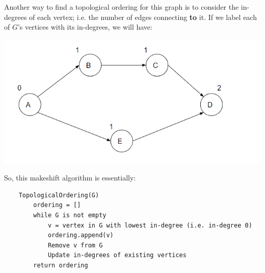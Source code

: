 \documentclass[letterpaper]{article}
\begin{document}
Another way to find a topological ordering for this graph is to consider the in-degrees of each vertex; i.e. the number of edges connecting \textbf{to} it. If we label each of $G$'s vertices with its in-degrees, we will have: 
\begin{center}
    \includegraphics[scale=0.7]{assets/dag_ex_deg_1.png}
\end{center}
So, this makeshift algorithm is essentially:
\begin{verbatim}
    TopologicalOrdering(G)
        ordering = []
        while G is not empty
            v = vertex in G with lowest in-degree (i.e. in-degree 0)
            ordering.append(v)
            Remove v from G
            Update in-degrees of existing vertices
        return ordering  
\end{verbatim}
\end{document}
